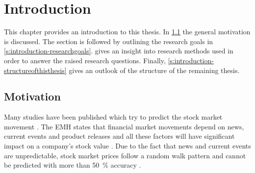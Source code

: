 
\chapter{Introduction}
\label{c:introduction}




This chapter provides an introduction to this thesis.
In \cref{s:introduction-motivation} the general motivation is discussed.
The section is followed by outlining the research goals in \cref{s:introduction-researchgoals}.
 gives an insight into research methods used in order to answer the raised research questions.
Finally, \cref{s:introduction-structureofthisthesis} gives an outlook of the structure of the remaining thesis.

\section{Motivation}
\label{s:introduction-motivation}

Many studies have been published which try to predict the stock market movement \citep[see][]{Bollen2011a,Mittal2012a,Nguyen2015a,Pagolu2016a,Zhang2011a}.
The \ac{EMH} states that financial market movements depend on news, current events and product releases and all these factors will have significant impact on a company's stock value
\citep{fama1965behavior}.
Due to the fact that news and current events are unpredictable, stock market prices follow a random walk pattern and cannot be predicted with more than \SI{50}{\percent} accuracy
\citep{Pagolu2016a}.

